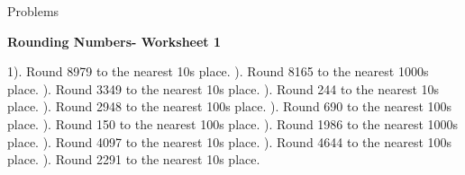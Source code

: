 \documentclass{article}%
\begin{document}
%
\huge%
\vspace*{\fill}%
\begin{center}%
Problems%
\end{center}%
\vspace*{\fill}%
\pagebreak%
\normalsize%
\large%
\begin{center}%
\textbf{Rounding Numbers- Worksheet 1}%
\newline%
\newline%
\newline%
\end{center} \normalsize%
1). Round 8979 to the nearest 10s place.%
\newline%
\newline%
). Round 8165 to the nearest 1000s place.%
\newline%
\newline%
). Round 3349 to the nearest 10s place.%
\newline%
\newline%
). Round 244 to the nearest 10s place.%
\newline%
\newline%
). Round 2948 to the nearest 100s place.%
\newline%
\newline%
). Round 690 to the nearest 100s place.%
\newline%
\newline%
). Round 150 to the nearest 100s place.%
\newline%
\newline%
). Round 1986 to the nearest 1000s place.%
\newline%
\newline%
). Round 4097 to the nearest 10s place.%
\newline%
\newline%
). Round 4644 to the nearest 100s place.%
\newline%
\newline%
). Round 2291 to the nearest 10s place.%
\newline%
\end{document}
